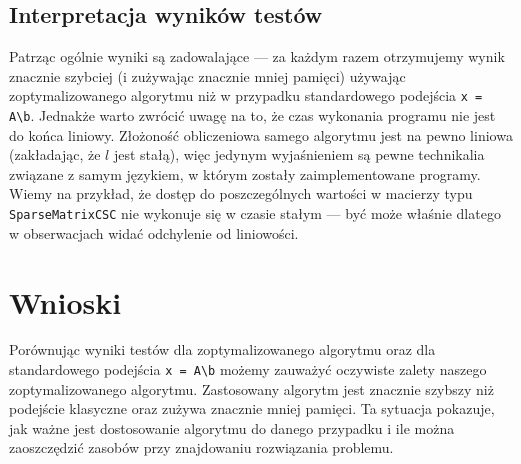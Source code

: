\documentclass[10pt]{article}
\begin{document}
\subsection{Interpretacja wyników testów}

Patrząc ogólnie wyniki są zadowalające — za każdym razem otrzymujemy wynik znacznie szybciej (i zużywając znacznie mniej pamięci) używając zoptymalizowanego algorytmu niż w przypadku standardowego podejścia \texttt{x = A\textbackslash b}. Jednakże warto zwrócić uwagę na to, że czas wykonania programu nie jest do końca liniowy.
Złożoność obliczeniowa samego algorytmu jest na pewno liniowa (zakładając, że $l$ jest stałą), więc jedynym wyjaśnieniem są pewne technikalia związane z samym językiem, w którym zostały zaimplementowane programy. Wiemy na przykład, że dostęp do poszczególnych wartości w macierzy typu \texttt{SparseMatrixCSC} nie wykonuje się w czasie stałym — być może właśnie dlatego w obserwacjach widać odchylenie od liniowości.

\section{Wnioski}

Porównując wyniki testów dla zoptymalizowanego algorytmu oraz dla standardowego podejścia \texttt{x = A\textbackslash b} możemy zauważyć oczywiste zalety naszego zoptymalizowanego algorytmu. Zastosowany algorytm jest znacznie szybszy niż podejście klasyczne oraz zużywa znacznie mniej pamięci. Ta sytuacja pokazuje, jak ważne jest dostosowanie algorytmu do danego przypadku i ile można zaoszczędzić zasobów przy znajdowaniu rozwiązania problemu.
\end{document}
